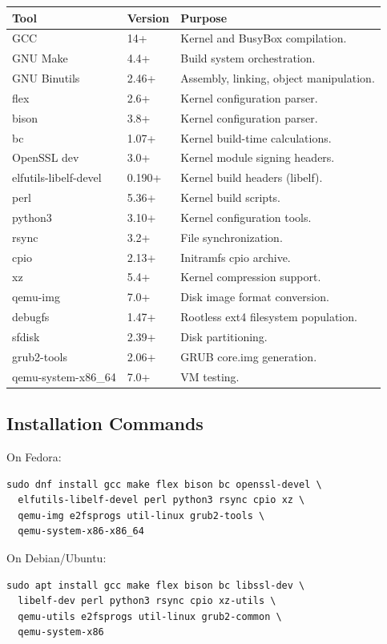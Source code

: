 \begin{longtable}{|p{4cm}|p{3cm}|p{5cm}|}
\hline
\textbf{Tool} & \textbf{Version} & \textbf{Purpose} \\
\hline
GCC & 14+ & Kernel and BusyBox compilation. \\
GNU Make & 4.4+ & Build system orchestration. \\
GNU Binutils & 2.46+ & Assembly, linking, object manipulation. \\
flex & 2.6+ & Kernel configuration parser. \\
bison & 3.8+ & Kernel configuration parser. \\
bc & 1.07+ & Kernel build-time calculations. \\
OpenSSL dev & 3.0+ & Kernel module signing headers. \\
elfutils-libelf-devel & 0.190+ & Kernel build headers (libelf). \\
perl & 5.36+ & Kernel build scripts. \\
python3 & 3.10+ & Kernel configuration tools. \\
rsync & 3.2+ & File synchronization. \\
cpio & 2.13+ & Initramfs cpio archive. \\
xz & 5.4+ & Kernel compression support. \\
qemu-img & 7.0+ & Disk image format conversion. \\
debugfs & 1.47+ & Rootless ext4 filesystem population. \\
sfdisk & 2.39+ & Disk partitioning. \\
grub2-tools & 2.06+ & GRUB core.img generation. \\
qemu-system-x86\_64 & 7.0+ & VM testing. \\
\hline
\end{longtable}

\subsection{Installation Commands}

On Fedora:
\begin{lstlisting}
sudo dnf install gcc make flex bison bc openssl-devel \
  elfutils-libelf-devel perl python3 rsync cpio xz \
  qemu-img e2fsprogs util-linux grub2-tools \
  qemu-system-x86-x86_64
\end{lstlisting}

On Debian/Ubuntu:
\begin{lstlisting}
sudo apt install gcc make flex bison bc libssl-dev \
  libelf-dev perl python3 rsync cpio xz-utils \
  qemu-utils e2fsprogs util-linux grub2-common \
  qemu-system-x86
\end{lstlisting}

